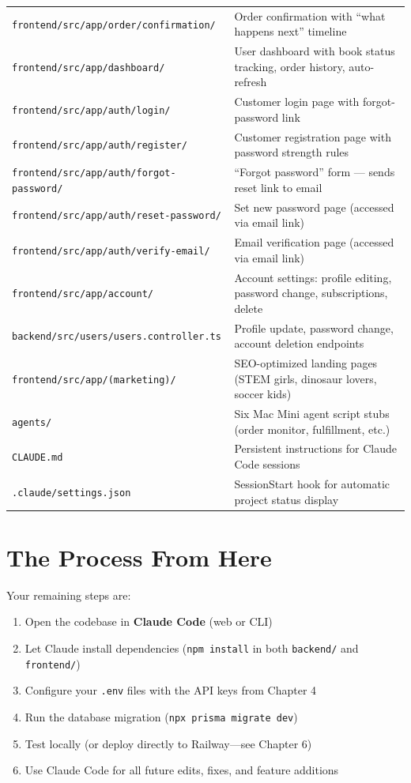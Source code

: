 \documentclass[12pt, letterpaper, oneside]{book}
\begin{document}
\begin{table}[H]
\begin{tabularx}{\textwidth}{lX}
\texttt{frontend/src/app/order/confirmation/} & Order confirmation with ``what happens next'' timeline \\
\texttt{frontend/src/app/dashboard/} & User dashboard with book status tracking, order history, auto-refresh \\
\texttt{frontend/src/app/auth/login/} & Customer login page with forgot-password link \\
\texttt{frontend/src/app/auth/register/} & Customer registration page with password strength rules \\
\texttt{frontend/src/app/auth/forgot-password/} & ``Forgot password'' form --- sends reset link to email \\
\texttt{frontend/src/app/auth/reset-password/} & Set new password page (accessed via email link) \\
\texttt{frontend/src/app/auth/verify-email/} & Email verification page (accessed via email link) \\
\texttt{frontend/src/app/account/} & Account settings: profile editing, password change, subscriptions, delete \\
\texttt{backend/src/users/users.controller.ts} & Profile update, password change, account deletion endpoints \\
\texttt{frontend/src/app/(marketing)/} & SEO-optimized landing pages (STEM girls, dinosaur lovers, soccer kids) \\
\texttt{agents/} & Six Mac Mini agent script stubs (order monitor, fulfillment, etc.) \\
\texttt{CLAUDE.md} & Persistent instructions for Claude Code sessions \\
\texttt{.claude/settings.json} & SessionStart hook for automatic project status display \\
\bottomrule
\end{tabularx}
\end{table}

\section{The Process From Here}

Your remaining steps are:

\begin{enumerate}[leftmargin=2em]
  \item Open the codebase in \textbf{Claude Code} (web or CLI)
  \item Let Claude install dependencies (\texttt{npm install} in both \texttt{backend/} and \texttt{frontend/})
  \item Configure your \texttt{.env} files with the API keys from Chapter 4
  \item Run the database migration (\texttt{npx prisma migrate dev})
  \item Test locally (or deploy directly to Railway---see Chapter 6)
  \item Use Claude Code for all future edits, fixes, and feature additions
\end{enumerate}
\end{document}

